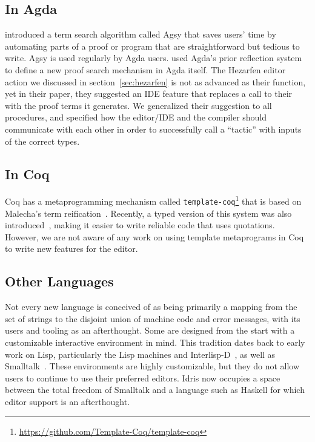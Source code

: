 \subsection{In Agda}

\citet{agsy} introduced a term search algorithm called
Agsy that saves users' time by automating
parts of a proof or program that are straightforward but tedious to write.
Agsy is used regularly by Agda users.
\citet{autoinagda} used Agda's prior reflection system to define a
new proof search mechanism in Agda itself.
The Hezarfen editor action we discussed in section~\ref{sec:hezarfen} is not as advanced
as their  function, yet in their paper, they suggested an IDE feature
that replaces a call to their  with the proof terms it generates.
We generalized their suggestion to all \Elab{} procedures, and specified
how the editor/IDE and the compiler should communicate with each other
in order to successfully call a ``tactic'' with inputs of the correct types.

\subsection{In Coq}

Coq has a metaprogramming mechanism called
\texttt{template-coq}\footnote{\url{https://github.com/Template-Coq/template-coq}}
that is based on Malecha's term
reification~\cite{malecha-phd}. Recently, a typed version of this
system was also introduced~\cite{typed-template-coq}, making it easier
to write reliable code that uses quotations.  However, we are not
aware of any work on using template metaprograms in Coq to write new
features for the editor.

\subsection{Other Languages}

Not every new language is conceived of as being primarily a mapping
from the set of strings to the disjoint union of machine code and
error messages, with its users and tooling as an afterthought. Some
are designed from the start with a customizable interactive
environment in mind. This tradition dates back to early work on Lisp,
particularly the Lisp machines and Interlisp-D~\citep{LispHist}, as
well as Smalltalk~\citep{Goldberg1984SmalltalkEnv}. These environments
are highly customizable, but they do not allow users to continue to
use their preferred editors. Idris now occupies a space between the
total freedom of Smalltalk and a language such as Haskell for which
editor support is an afterthought.

